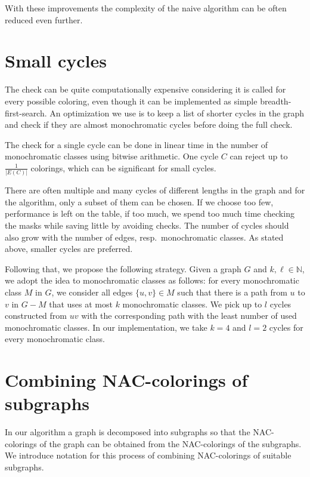 With these improvements the complexity of the naive algorithm can be often
reduced even further.

\section{Small cycles}%
\label{sec:small_cycles}

The check \IsNACColoring{} can be quite computationally expensive
considering it is called for every possible coloring,
even though it can be implemented as simple breadth-first-search.
An optimization we use is to keep a list of shorter cycles in the graph and
check if they are almost monochromatic cycles before doing the full check.

The check for a single cycle can be done in linear time
in the number of monochromatic classes using bitwise arithmetic.
One cycle $C$ can reject up to $\frac{1}{|E(C)|}$ colorings,
which can be significant for small cycles.

There are often multiple and many cycles of different lengths in the graph
and for the algorithm, only a subset of them can be chosen.
If we choose too few, performance is left on the table, if too much,
we spend too much time checking the masks while saving little
by avoiding \IsNACColoring{} checks.
The number of cycles should also grow with the number of edges,
resp.\ monochromatic classes.
As stated above, smaller cycles are preferred.

Following that, we propose the following strategy.
Given a graph $G$ and $k,\ell\in \mathbb{N}$,
we adopt the idea to monochromatic classes as follows:
for every monochromatic class $M$ in $G$,
we consider all edges $\{u, v\} \in M$ such that there is a path from $u$ to $v$
in $G - M$ that uses at most $k$ monochromatic classes.
We pick up to $l$ cycles constructed from $uv$ with the corresponding
path with the least number of used monochromatic classes.
In our implementation, we take $k=4$ and $l=2$ cycles for every monochromatic class.

\section{Combining NAC-colorings of subgraphs}%
\label{sec:combining}

In our algorithm a graph is decomposed into subgraphs so that
the NAC-colorings of the graph can be obtained from the NAC-colorings of the subgraphs.
We introduce notation for this process of combining NAC-colorings of suitable subgraphs.

